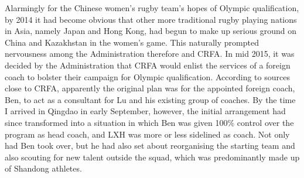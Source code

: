   Alarmingly for the Chinese women's rugby team's hopes of Olympic qualification, by 2014 it had become obvious that other more traditional rugby playing nations in Asia, namely Japan and Hong Kong, had begun to make up serious ground on China and Kazakhstan in the women's game.  This naturally prompted nervousness among the Administration therefore and CRFA.  In mid 2015, it was decided by the Administration that CRFA would enlist the services of a foreign coach to bolster their campaign for Olympic qualification.  According to sources close to CRFA, apparently the original plan was for the appointed foreign coach, Ben, to act as a consultant for Lu and his existing group of coaches.  By the time I arrived in Qingdao in early September, however, the initial arrangement had since transformed into a situation in which Ben was given 100\% control over the program as head coach, and LXH was more or less sidelined as coach. Not only had Ben took over, but he had also set about reorganising the starting team and also scouting for new talent outside the squad, which was predominantly made up of Shandong athletes.


